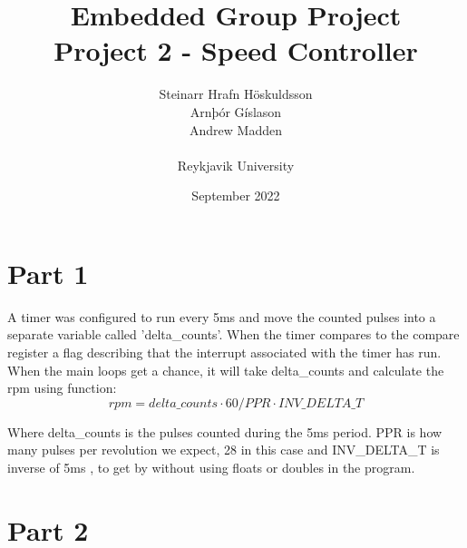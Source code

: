 \documentclass{article}
\title{Embedded Group Project\\ \large Project 2 - Speed Controller}
\author{Steinarr Hrafn Höskuldsson\\
Arnþór Gíslason\\
Andrew Madden\\
\\
Reykjavik University}
\date{September 2022}
\newcommand{\mycomment}[1]{}
\newcommand{\timerinterval}{5ms }
\begin{document}
\maketitle
\mycomment{
\begin{figure}[h]
    \centering
    \texttt{[image: LAB3/Basic1.png]}
    \caption{"Switch test" Breadboard set up}
    \label{fig:Switch_test}
\end{figure}



}

\section{Part 1}
A timer was configured to run every \timerinterval and move the counted pulses into a separate variable called 'delta\_counts'. When the timer compares to the compare register a flag describing that the interrupt associated with the timer has run. 
When the main loops get a chance, it will take delta\_counts and calculate the rpm using function: 
\begin{equation}
     rpm = delta\_counts \cdot 60 / PPR \cdot INV\_DELTA\_T
\end{equation}

Where delta\_counts is the pulses counted during the \timerinterval period. PPR is how many pulses per revolution we expect, 28 in this case and INV\_DELTA\_T is inverse of \timerinterval, to get by without using floats or doubles in the program.

\section{Part 2}
\end{document}
